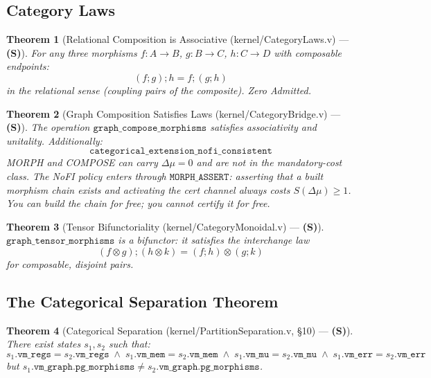 \documentclass[11pt, a4paper]{report}
\theoremstyle{definition}
\theoremstyle{plain}
\newtheorem{theorem}{Theorem}[chapter]
\begin{document}
\subsection{Category Laws}

\begin{theorem}[Relational Composition is Associative {\normalfont (kernel/CategoryLaws.v)} --- \textbf{(S)}]
\label{thm:compose_assoc}
For any three morphisms $f : A \to B$, $g : B \to C$, $h : C \to D$ with composable endpoints:
\[ (f ; g) ; h = f ; (g ; h) \]
in the relational sense (coupling pairs of the composite). Zero Admitted.
\end{theorem}

\begin{theorem}[Graph Composition Satisfies Laws {\normalfont (kernel/CategoryBridge.v)} --- \textbf{(S)}]
\label{thm:graph_compose_assoc}
The operation $\texttt{graph\_compose\_morphisms}$ satisfies associativity and unitality. Additionally:
\[ \texttt{categorical\_extension\_nofi\_consistent} \]
MORPH and COMPOSE can carry $\Delta\mu = 0$ and are not in the mandatory-cost class. The NoFI policy enters through $\texttt{MORPH\_ASSERT}$: asserting that a built morphism chain exists and activating the cert channel always costs $S(\Delta\mu) \geq 1$. You can build the chain for free; you cannot certify it for free.
\end{theorem}

\begin{theorem}[Tensor Bifunctoriality {\normalfont (kernel/CategoryMonoidal.v)} --- \textbf{(S)}]
\label{thm:tensor_bifunctor}
$\texttt{graph\_tensor\_morphisms}$ is a bifunctor: it satisfies the interchange law
\[ (f \otimes g) ; (h \otimes k) = (f ; h) \otimes (g ; k) \]
for composable, disjoint pairs.
\end{theorem}

\subsection{The Categorical Separation Theorem}

\begin{theorem}[Categorical Separation {\normalfont (kernel/PartitionSeparation.v, §10)} --- \textbf{(S)}]
\label{thm:categorical_separation}
There exist states $s_1, s_2$ such that:
\[
s_1.\texttt{vm\_regs} = s_2.\texttt{vm\_regs} \;\wedge\;
s_1.\texttt{vm\_mem}  = s_2.\texttt{vm\_mem}  \;\wedge\;
s_1.\texttt{vm\_mu}   = s_2.\texttt{vm\_mu}   \;\wedge\;
s_1.\texttt{vm\_err}  = s_2.\texttt{vm\_err}
\]
but $s_1.\texttt{vm\_graph}.\texttt{pg\_morphisms} \neq s_2.\texttt{vm\_graph}.\texttt{pg\_morphisms}$.
\end{theorem}
\end{document}
